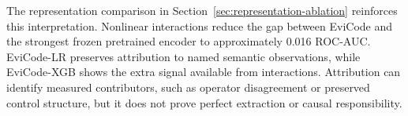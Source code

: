 \documentclass[conference]{IEEEtran}
\begin{document}
The representation comparison in Section~\ref{sec:representation-ablation} reinforces this interpretation. Nonlinear interactions reduce the gap between EviCode and the strongest frozen pretrained encoder to approximately 0.016 ROC-AUC. EviCode-LR preserves attribution to named semantic observations, while EviCode-XGB shows the extra signal available from interactions. Attribution can identify measured contributors, such as operator disagreement or preserved control structure, but it does not prove perfect extraction or causal responsibility.

\begin{figure}[!t]
\centering
\setlength{\fboxsep}{4pt}
\end{figure}
\end{document}

